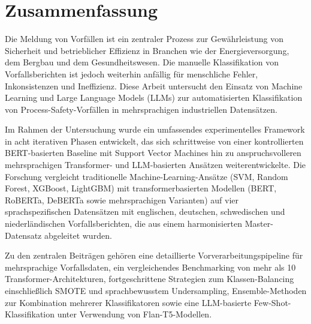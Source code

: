 \documentclass[11pt, titlepage, bibliography=totoc]{scrreprt}
\begin{document}
\cleardoublepage

\chapter*{Zusammenfassung}

Die Meldung von Vorfällen ist ein zentraler Prozess zur Gewährleistung von Sicherheit und betrieblicher Effizienz in Branchen wie der Energieversorgung, dem Bergbau und dem Gesundheitswesen. Die manuelle Klassifikation von Vorfallsberichten ist jedoch weiterhin anfällig für menschliche Fehler, Inkonsistenzen und Ineffizienz. Diese Arbeit untersucht den Einsatz von Machine Learning und Large Language Models (LLMs) zur automatisierten Klassifikation von Process-Safety-Vorfällen in mehrsprachigen industriellen Datensätzen.

Im Rahmen der Untersuchung wurde ein umfassendes experimentelles Framework in acht iterativen Phasen entwickelt, das sich schrittweise von einer kontrollierten BERT-basierten Baseline mit Support Vector Machines hin zu anspruchsvolleren mehrsprachigen Transformer- und LLM-basierten Ansätzen weiterentwickelte. Die Forschung vergleicht traditionelle Machine-Learning-Ansätze (SVM, Random Forest, XGBoost, LightGBM) mit transformerbasierten Modellen (BERT, RoBERTa, DeBERTa sowie mehrsprachigen Varianten) auf vier sprachspezifischen Datensätzen mit englischen, deutschen, schwedischen und niederländischen Vorfallsberichten, die aus einem harmonisierten Master-Datensatz abgeleitet wurden.

Zu den zentralen Beiträgen gehören eine detaillierte Vorverarbeitungspipeline für mehrsprachige Vorfallsdaten, ein vergleichendes Benchmarking von mehr als 10 Transformer-Architekturen, fortgeschrittene Strategien zum Klassen-Balancing einschließlich SMOTE und sprachbewusstem Undersampling, Ensemble-Methoden zur Kombination mehrerer Klassifikatoren sowie eine LLM-basierte Few-Shot-Klassifikation unter Verwendung von Flan-T5-Modellen.
\end{document}

